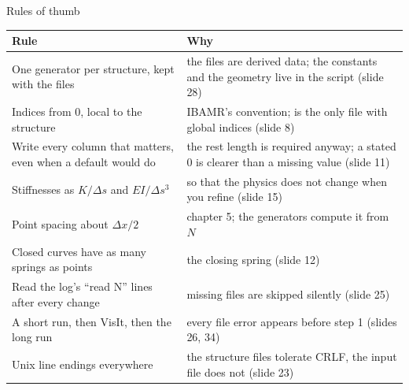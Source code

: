 \documentclass[aspectratio=169,11pt]{beamer}
\begin{document}
\begin{frame}{Rules of thumb}
\scriptsize
\begin{tabular}{@{}L{0.26\textwidth}L{0.66\textwidth}@{}}
\toprule
Rule & Why\\
\midrule
One generator per structure, kept with the files & the files are derived data; the constants and the geometry live in the script (slide 28)\\
Indices from 0, local to the structure & IBAMR's convention;  is the only file with global indices (slide 8)\\
Write every column that matters, even when a default would do & the rest length is required anyway; a stated 0 is clearer than a missing value (slide 11)\\
Stiffnesses as $K/\Delta s$ and $EI/\Delta s^3$ & so that the physics does not change when you refine (slide 15)\\
Point spacing about $\Delta x/2$ & chapter 5; the generators compute it from $N$\\
Closed curves have as many springs as points & the closing spring (slide 12)\\
Read the log's ``read N'' lines after every change & missing files are skipped silently (slide 25)\\
A short run, then VisIt, then the long run & every file error appears before step 1 (slides 26, 34)\\
Unix line endings everywhere & the structure files tolerate CRLF, the input file does not (slide 23)\\
\bottomrule
\end{tabular}
\end{frame}
\end{document}
